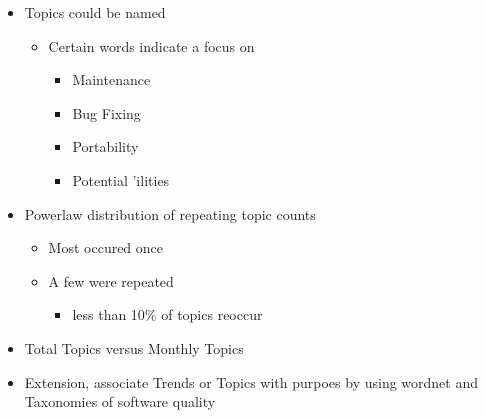\documentclass[titlepage,usenames,a4,landscape,semhelv,16pt]{seminar}
\begin{document}
\begin{slide}
\begin{itemize}
\begin{itemize}







\end{itemize}
\end{itemize}
\begin{itemize}
\item Topics could be named
	\begin{itemize}
	\item Certain words indicate a focus on
		\begin{itemize}
		\item Maintenance
		\item Bug Fixing
		\item Portability
		\item Potential 'ilities

	\end{itemize}
\end{itemize}
\end{itemize}
\begin{itemize}
\item Powerlaw distribution of repeating topic counts
	\begin{itemize}
	\item Most occured once
	\item A few were repeated 
		\begin{itemize}
		\item less than 10\% of topics reoccur



	\end{itemize}
\end{itemize}
\end{itemize}
\begin{itemize}
\item Total Topics versus Monthly Topics

\end{itemize}
\begin{itemize}
\item Extension, associate Trends or Topics with purpoes by using wordnet and Taxonomies of software quality 

\end{itemize}
\end{slide}
\end{document}
